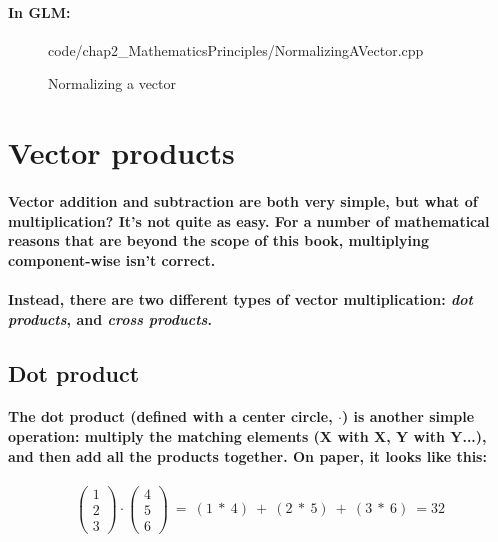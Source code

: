 \paragraph{
    In GLM:
}

\begin{frame}{}
    \begin{figure}[ht]
    \centering
    \colorbox{backgroundcolor}{
        \parbox{0.9\textwidth}{
            
            {code/chap2_MathematicsPrinciples/NormalizingAVector.cpp}
        }
    }
    \caption{Normalizing a vector}
    \label{fig:normalizing_a_vector}
    \end{figure}
\end{frame}

\section{Vector products}
\paragraph{
    Vector addition and subtraction are both very simple, but what of multiplication? It's not quite as easy. For a number of mathematical reasons that are beyond the scope of this book, multiplying component-wise isn't correct.
}

\paragraph{
    Instead, there are two different types of vector multiplication: \emph{dot products}, and \emph{cross products}.
}

\subsection{Dot product}
\paragraph{
    The dot product (defined with a center circle, $\cdot$) is another simple operation: multiply the matching elements (X with X, Y with Y...), and then add all the products together. On paper, it looks like this:
}

\paragraph{
    \begin{equation*}
    \begin{pmatrix}
    1\\
    2\\
    3
    \end{pmatrix} \cdot \begin{pmatrix}
    4\\
    5\\
    6
    \end{pmatrix} \ =\ ( 1\ *\ 4) \ +\ ( 2\ *\ 5) \ +\ ( 3\ *\ 6) \ =32
    \end{equation*}
}

